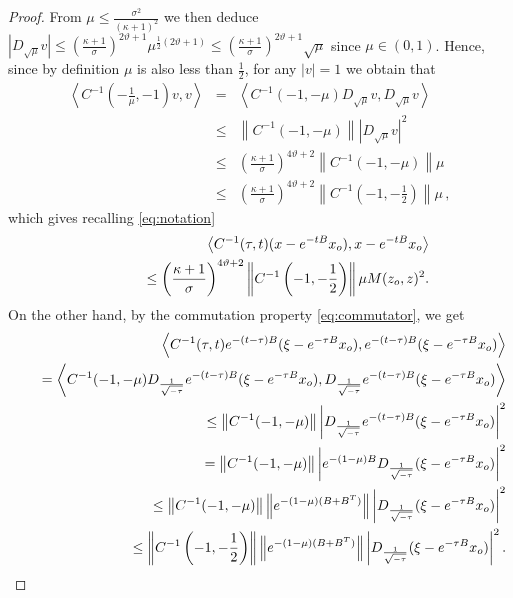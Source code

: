 \documentclass[10pt,a4paper]{amsart}
\begin{document}
\begin{proof}
From $\mu\leq \frac{\sigma^2}{(\kappa+1)^2}$ we then deduce $\left|D_{\sqrt{\mu}}v\right|\leq \left(\frac{\kappa+1}{\sigma}\right)^{2\vartheta +1}\mu^{\frac{1}{2}(2\vartheta +1)} \leq \left(\frac{\kappa+1}{\sigma}\right)^{2\vartheta +1}\sqrt{\mu} $ since $\mu \in (0,1)$. Hence, since by definition $\mu$ is also less than $\frac{1}{2}$,  for any $|v|=1$ we obtain that
\begin{eqnarray*}
\left\langle C^{-1}\left(-\frac{1}{\mu},-1\right)v,v \right\rangle&=&\left\langle C^{-1}(-1,-\mu)D_{\sqrt{\mu}}v,D_{\sqrt{\mu}}v\right\rangle\\
& \leq &  \left\|C^{-1}(-1,-\mu)\right\|\left|D_{\sqrt{\mu}}v\right|^2\\
&\leq& \left(\frac{\kappa+1}{\sigma}\right)^{4\vartheta +2}\left\|C^{-1}\left(-1,-\mu\right)\right\|\mu\\
& \leq &  \left(\frac{\kappa+1}{\sigma}\right)^{4\vartheta +2}\left\|C^{-1}\left(-1,-\frac{1}{2}\right)\right\|\mu\,,
\end{eqnarray*}
which gives recalling \eqref{eq:notation}
\begin{eqnarray*}
&& \left\langle C^{-1}(\tau,t)(x-e^{-tB}x_{\rm o}),x-e^{-tB}x_{\rm o}\right\rangle\notag\\
&& \qquad\quad \leq \left(\frac{\kappa+1}{\sigma}\right)^{4\vartheta +2}\left\|C^{-1}\left(-1,-\frac{1}{2}\right)\right\|\mu M(z_{\rm o},z)^2.
\end{eqnarray*}
On the other hand, by the commutation property \eqref{eq:commutator}, we get
\begin{eqnarray*}
&& \left\langle C^{-1}(\tau,t)e^{-(t-\tau)B}(\xi -e^{-\tau B}x_{\rm o}),e^{-(t-\tau)B}(\xi -e^{-\tau B}x_{\rm o})\right\rangle\notag\\
&& \quad =  \left\langle C^{-1}(-1,-\mu)D_{\frac{1}{\sqrt{-\tau}}}e^{-(t-\tau)B}(\xi -e^{-\tau B}x_{\rm o}),D_{\frac{1}{\sqrt{-\tau}}}e^{-(t-\tau)B}(\xi -e^{-\tau B}x_{\rm o})\right\rangle\\
&& \quad \leq\left\|C^{-1}(-1,-\mu)\right\|\left|D_{\frac{1}{\sqrt{-\tau}}}e^{-(t-\tau)B}(\xi -e^{-\tau B}x_{\rm o})\right|^2\notag\\
&& \quad = \left\|C^{-1}(-1,-\mu)\right\|\left|e^{-(1-\mu)B}D_{\frac{1}{\sqrt{-\tau}}}(\xi -e^{-\tau B}x_{\rm o})\right|^2\\
&& \quad \leq \left\|C^{-1}(-1,-\mu)\right\|\left\|e^{-(1-\mu)(B+B^T)}\right\|\left|D_{\frac{1}{\sqrt{-\tau}}}(\xi -e^{-\tau B}x_{\rm o})\right|^2\\
&& \quad \leq \left\|C^{-1}\left(-1,-\frac{1}{2}\right)\right\|\left\|e^{-(1-\mu)(B+B^T)}\right\|\left|D_{\frac{1}{\sqrt{-\tau}}}(\xi -e^{-\tau B}x_{\rm o})\right|^2.

\end{eqnarray*}
\end{proof}
\end{document}

